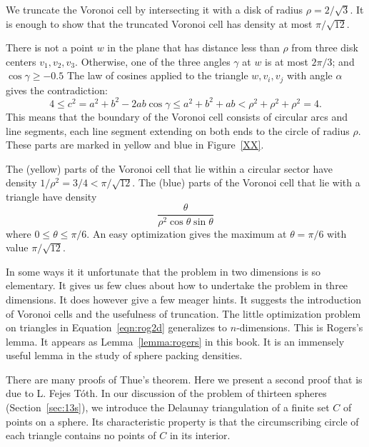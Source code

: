 We truncate the Voronoi cell by intersecting it with a disk of radius
$\rho=2/\sqrt3$.  It is enough to show that the truncated Voronoi cell has
density  at most $\pi/\sqrt{12}$.  

There is not a point $w$ in the plane that has distance less than $\rho$
from three disk centers $v_1,v_2,v_3$.  Otherwise, one of the three
angles $\gamma$ at $w$ is at most $2\pi/3$; and $\cos\gamma\ge -0.5$  
The law of cosines applied
to the triangle $w,v_i,v_j$ with angle $\alpha$ gives the contradiction:
   $$
   4 \le c^2 = a^2 + b^2 - 2 a b \cos\gamma 
   \le a^2 + b^2 + a b < \rho^2 + \rho^2 + \rho^2 = 4.
   $$
This means that the boundary of the Voronoi cell consists of circular
arcs and line segments, each line segment extending on both ends to
the circle of radius $\rho$.  These parts are marked in
yellow and blue in  Figure~\ref{XX}. %

The (yellow)
parts of the Voronoi cell that lie within a circular sector have density
$1/\rho^2 = 3/4 < \pi/\sqrt{12}$.  The (blue)
parts of the Voronoi cell that
lie with a triangle have density
   \begin{equation}\label{eqn:rog2d}
   \frac{\theta}{\rho^2 \cos\theta\sin\theta}
   \end{equation}
where $0 \le \theta\le \pi/6$.  An easy optimization gives the maximum
at $\theta=\pi/6$ with value $\pi/\sqrt{12}$.

In some ways it it unfortunate that the problem in two dimensions is so
elementary.  It gives us few clues about how to undertake the problem in
three dimensions.  It does however give a few meager hints.  It suggests the
introduction of Voronoi cells and the usefulness of truncation.
The little optimization problem on triangles in Equation~\ref{eqn:rog2d}
generalizes to $n$-dimensions.  This is Rogers's lemma.
It appears as Lemma~\ref{lemma:rogers} in this book.  It is an immensely
useful lemma in the study of sphere packing densities.


\bigskip

There are many proofs of Thue's theorem.  Here we present a second proof
that is due to L. Fejes T\'oth.  In our discussion of the problem of thirteen
spheres (Section~\ref{sec:13s}), we  introduce the Delaunay
triangulation of a finite set $C$ of points on a sphere.
Its characteristic property is that the circumscribing circle of each
triangle contains no points of $C$ in its interior.

